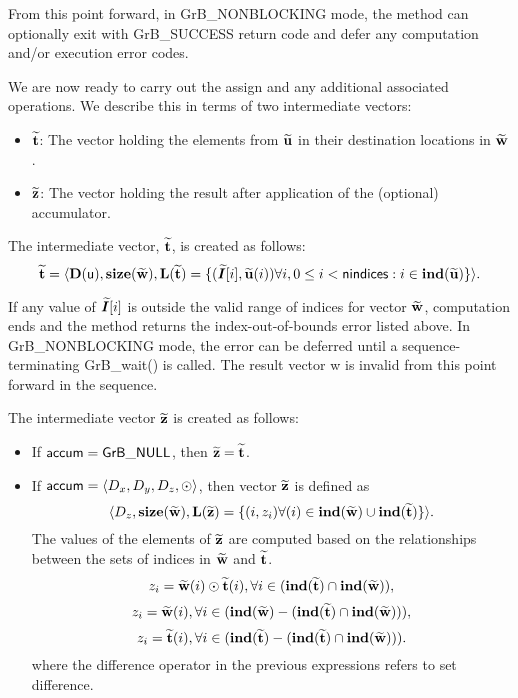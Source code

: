 From this point forward, in {\sf GrB\_NONBLOCKING} mode, the method can optionally exit
with {\sf GrB\_SUCCESS} return code and defer any computation and/or execution error
codes.

We are now ready to carry out the assign and any additional 
associated operations.  We describe this in terms of two intermediate vectors:
\begin{itemize}
	\item ${\bf \widetilde{t}}$: The vector holding the elements from
		${\bf \widetilde{u}}$ in their destination locations in ${\bf \widetilde{w}}$.
	\item ${\bf \widetilde{z}}$: The vector holding the result after 
    application of the (optional) accumulator.
\end{itemize}

The intermediate vector, ${\bf \widetilde{t}}$, is created as follows:
\[ {\bf \widetilde{t}} = \langle
\bold{D}({\sf u}), \bold{size}({\bf \widetilde{w}}),
\bold{L}({\bf \widetilde{t}}) =
\{(\bm{\widetilde{I}}[i],{\bf \widetilde{u}}(i)) \forall i, 0 \leq i < {\sf nindices} : 
i \in \bold{ind}({\bf \widetilde{u}}) \} \rangle. \]

If any value of $\bm{\widetilde{I}}[i]$ is outside the valid range of indices
for vector ${\bf \widetilde{w}}$, computation ends and the method returns the
index-out-of-bounds error listed above. In {\sf GrB\_NONBLOCKING} mode, the error
can be deferred until a sequence-terminating {\sf GrB\_wait()} is called.
The result vector {\sf w} is invalid  from this point forward in
the sequence.

The intermediate vector ${\bf \widetilde{z}}$ is created as follows:
\begin{itemize}
    \item If ${\sf accum} = {\sf GrB\_NULL}$, then ${\bf \widetilde{z}} = {\bf \widetilde{t}}$.

    \item If ${\sf accum} = \langle D_x, D_y, D_z, \odot \rangle$, then vector ${\bf \widetilde{z}}$ is defined as 
        \[ \langle D_z, \bold{size}({\bf \widetilde{w}}), \bold{L}({\bf \widetilde{z}})
		= \{(i,z_{i})  \forall (i) \in \bold{ind}({\bf \widetilde{w}}) \cup 
        \bold{ind}({\bf \widetilde{t}}) \} \rangle.\]
    The values of the elements of ${\bf \widetilde{z}}$ are computed based on the relationships between the sets of indices in ${\bf \widetilde{w}}$ and ${\bf \widetilde{t}}$.
\[
z_{i} = {\bf \widetilde{w}}(i) \odot {\bf \widetilde{t}}(i), \forall i \in  (\bold{ind}({\bf \widetilde{t}}) \cap \bold{ind}({\bf \widetilde{w}})),
\]
\[
z_{i} = {\bf \widetilde{w}}(i), \forall  i \in  (\bold{ind}({\bf \widetilde{w}}) - (\bold{ind}({\bf \widetilde{t}}) \cap \bold{ind}({\bf \widetilde{w}}))),
\]
\[
z_{i} = {\bf \widetilde{t}}(i), \forall  i \in  (\bold{ind}({\bf \widetilde{t}}) - (\bold{ind}({\bf \widetilde{t}}) \cap \bold{ind}({\bf \widetilde{w}}))).
\]
where the difference operator in the previous expressions refers to set difference.
\end{itemize}

